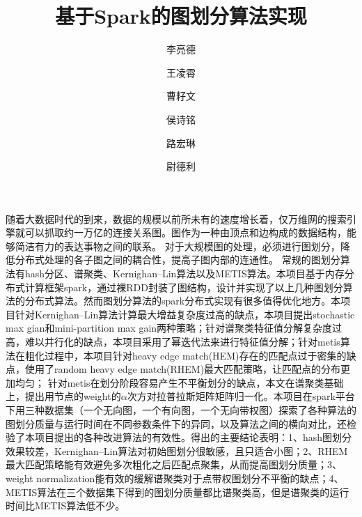 \documentclass[UTF8,12pt]{ctexart} %
\theoremstyle{definition}
\begin{document}
\title{基于Spark的图划分算法实现}
\author[1]{李亮德}
\author[1]{王凌霄}
\author[2]{曹籽文}
\author[2]{侯诗铭}
\author[2]{路宏琳}
\author[3]{尉德利}
\renewcommand\Authands{, }

\maketitle

\renewcommand{\abstractname}{}
\begin{onecolabstract}
    随着大数据时代的到来，数据的规模以前所未有的速度增长着，仅万维网的搜索引擎就可以抓取约一万亿的连接关系图。图作为一种由顶点和边构成的数据结构，能够简洁有力的表达事物之间的联系。
    对于大规模图的处理，必须进行图划分，降低分布式处理的各子图之间的耦合性，提高子图内部的连通性。
    常规的图划分算法有hash分区、谱聚类、Kernighan–Lin算法以及METIS算法。本项目基于内存分布式计算框架spark，通过裸RDD封装了图结构，设计并实现了以上几种图划分算法的分布式算法。然而图划分算法的spark分布式实现有很多值得优化地方。本项目针对Kernighan–Lin算法计算最大增益复杂度过高的缺点，本项目提出stochastic max gian和mini-partition max gain两种策略；针对谱聚类特征值分解复杂度过高，难以并行化的缺点，本项目采用了幂迭代法来进行特征值分解；针对metis算法在粗化过程中，本项目针对heavy edge match(HEM)存在的匹配点过于密集的缺点，使用了random heavy edge match(RHEM)最大匹配策略，让匹配点的分布更加均匀；
    针对metis在划分阶段容易产生不平衡划分的缺点，本文在谱聚类基础上，提出用节点的weight的$\alpha$次方对拉普拉斯矩阵矩阵归一化。本项目在spark平台下用三种数据集（一个无向图，一个有向图，一个无向带权图）探索了各种算法的图划分质量与运行时间在不同参数条件下的异同，以及算法之间的横向对比，还检验了本项目提出的各种改进算法的有效性。得出的主要结论表明：1、hash图划分效果较差，Kernighan–Lin算法对初始图划分很敏感，且只适合小图；2、RHEM最大匹配策略能有效避免多次粗化之后匹配点聚集，从而提高图划分质量；3、weight normalization能有效的缓解谱聚类对于点带权图划分不平衡的缺点；4、METIS算法在三个数据集下得到的图划分质量都比谱聚类高，但是谱聚类的运行时间比METIS算法低不少。
\end{onecolabstract}

\newpage
\tableofcontents
\newpage







\end{document}
